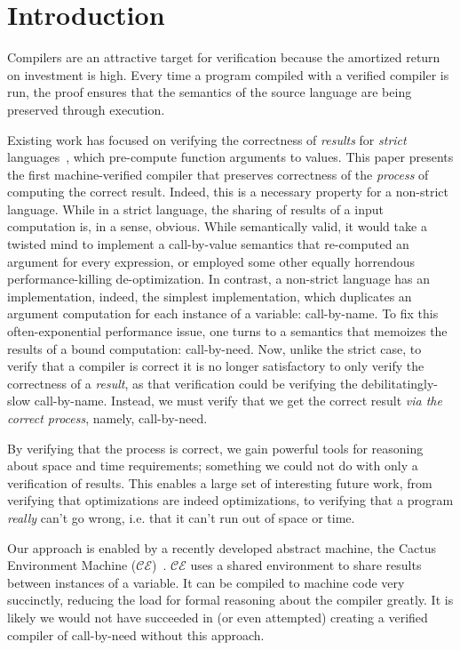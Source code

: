 \section{Introduction}

Compilers are an attractive target for verification because the amortized return
on investment is high. Every time a program compiled with a verified compiler is
run, the proof ensures that the semantics of the source language are being
preserved through execution. 

Existing work has focused on verifying the correctness of \emph{results} for
\emph{strict} languages~\cite{chlipala2007certified, leroy2012compcert}, which
pre-compute function arguments to values. This paper presents the first
machine-verified compiler that preserves correctness of the \emph{process} of
computing the correct result. Indeed, this is a necessary property for a
non-strict language. While in a strict language, the sharing of results of a
input computation is, in a sense, obvious. While semantically valid, it would
take a twisted mind to implement a call-by-value semantics that re-computed an
argument for every expression, or employed some other equally horrendous
performance-killing de-optimization. In contrast, a non-strict language has an
implementation, indeed, the simplest implementation, which duplicates an
argument computation for each instance of a variable: call-by-name. To fix this
often-exponential performance issue, one turns to a semantics that memoizes the
results of a bound computation: call-by-need. Now, unlike the strict case, to
verify that a compiler is correct it is no longer satisfactory to only verify
the correctness of a \emph{result}, as that verification could be verifying the
debilitatingly-slow call-by-name. Instead, we must verify that we get the
correct result \emph{via the correct process}, namely, call-by-need. 

By verifying that the process is correct, we gain powerful tools for reasoning
about space and time requirements; something we could not do with only a
verification of results. This enables a large set of interesting future work,
from verifying that optimizations are indeed optimizations, to verifying that a
program \emph{really} can't go wrong, i.e. that it can't run out of space or
time. 

Our approach is enabled by a recently developed abstract machine, the Cactus
Environment Machine ($\mathcal{CE}$)~\cite{?}. $\mathcal{CE}$ uses a shared
environment to share results between instances of a variable. It can be compiled
to machine code very succinctly, reducing the load for formal reasoning about
the compiler greatly. It is likely we would not have succeeded in (or even
attempted) creating a verified compiler of call-by-need without this approach.

